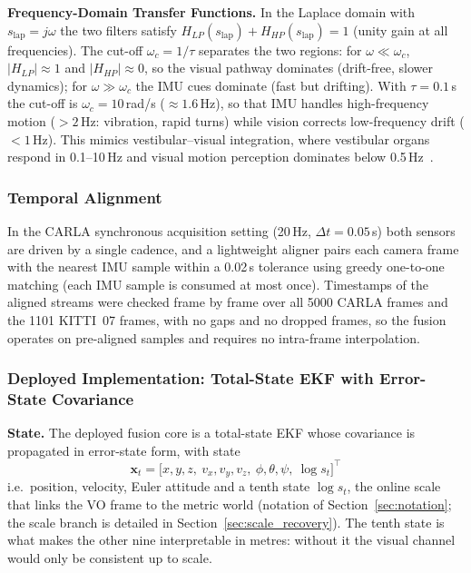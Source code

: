 \textbf{Frequency-Domain Transfer Functions.} In the Laplace domain with $s_{\mathrm{lap}}=j\omega$ the two filters satisfy $H_{LP}(s_{\mathrm{lap}})+H_{HP}(s_{\mathrm{lap}})=1$ (unity gain at all frequencies). The cut-off $\omega_c=1/\tau$ separates the two regions: for $\omega\ll\omega_c$, $|H_{LP}|\approx1$ and $|H_{HP}|\approx0$, so the visual pathway dominates (drift-free, slower dynamics); for $\omega\gg\omega_c$ the IMU cues dominate (fast but drifting). With $\tau=0.1$\,s the cut-off is $\omega_c=10$\,rad/s ($\approx1.6$\,Hz), so that IMU handles high-frequency motion ($>2$\,Hz: vibration, rapid turns) while vision corrects low-frequency drift ($<1$\,Hz). This mimics ves\-tib\-u\-lar--visual integration, where ves\-tib\-u\-lar organs respond in 0.1--10\,Hz and visual motion perception dominates below 0.5\,Hz~\cite{Angelaki2004}.

\subsubsection{Temporal Alignment}
\label{sec:alignment}

In the CARLA synchronous acquisition setting (20\,Hz, $\Delta t=0.05$\,s) both sensors are driven by a single cadence, and a lightweight aligner pairs each camera frame with the nearest IMU sample within a 0.02\,s tolerance using greedy one-to-one matching (each IMU sample is consumed at most once). Timestamps of the aligned streams were checked frame by frame over all 5000 CARLA frames and the 1101 KITTI~07 frames, with no gaps and no dropped frames, so the fusion operates on pre-aligned samples and requires no intra-frame interpolation.

\subsubsection{Deployed Implementation: Total-State EKF with Error-State Covariance}
\label{sec:deployed_filter}

\textbf{State.} The deployed fusion core is a total-state EKF whose covariance is propagated in error-state form, with state
\begin{equation}
    \mathbf{x}_t=\big[x,y,z,\ v_x,v_y,v_z,\ \phi,\theta,\psi,\ \log s_t\big]^{\!\top}
    \label{eq:state}
\end{equation}
i.e.\ position, velocity, Euler attitude and a tenth state $\log s_t$, the online scale that links the VO frame to the metric world (notation of Section~\ref{sec:notation}; the scale branch is detailed in Section~\ref{sec:scale_recovery}). The tenth state is what makes the other nine interpretable in metres: without it the visual channel would only be consistent up to scale.

